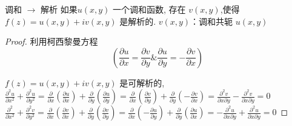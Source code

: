 \documentclass[cn,11pt,chinese,black]{elegantbook}
\begin{document}
\begin{theorem}{调和 $\rightarrow$ 解析}
\noindent 如果$u(x, y)$ 一个调和函数, 存在 $v(x, y)$,使得 $f(z)=u(x, y)+i v(x, y)$ 是解析的.
$v(x, y)$：调和共轭 $u(x, y)$
\end{theorem}
\begin{proof}
利用柯西黎曼方程$$ \left(\frac{\partial u}{\partial x}=\frac{\partial v}{\partial y} \& \frac{\partial u}{\partial y}=-\frac{\partial v}{\partial x}\right)$$ 

$f(z)=u(x, y)+i v(x, y)$ 是可解析的, \\
$\frac{\partial^{2} u}{\partial x^{2}}+\frac{\partial^{2} u}{\partial y^{2}}=\frac{\partial}{\partial x}\left(\frac{\partial u}{\partial x}\right)+\frac{\partial}{\partial y}\left(\frac{\partial u}{\partial y}\right)=\frac{\partial}{\partial x}\left(\frac{\partial v}{\partial y}\right)+\frac{\partial}{\partial y}\left(-\frac{\partial v}{\partial x}\right)=\frac{\partial^{2} v}{\partial x \partial y}-\frac{\partial^{2} v}{\partial x \partial y}=0$\\
$\frac{\partial^{2}}{\partial x^{2}}+\frac{\partial^{2} v}{\partial y^{2}}=\frac{\partial}{\partial x}\left(\frac{\partial v}{\partial x}\right)+\frac{\partial}{\partial y}\left(\frac{\partial v}{\partial y}\right)=\frac{\partial}{\partial x}\left(-\frac{\partial u}{\partial y}\right)+\frac{\partial}{\partial y}\left(\frac{\partial u}{\partial x}\right)=-\frac{\partial^{2} u}{\partial x \partial y}+\frac{\partial^{2} u}{\partial x \partial y}=0$
\end{proof}
\end{document}
